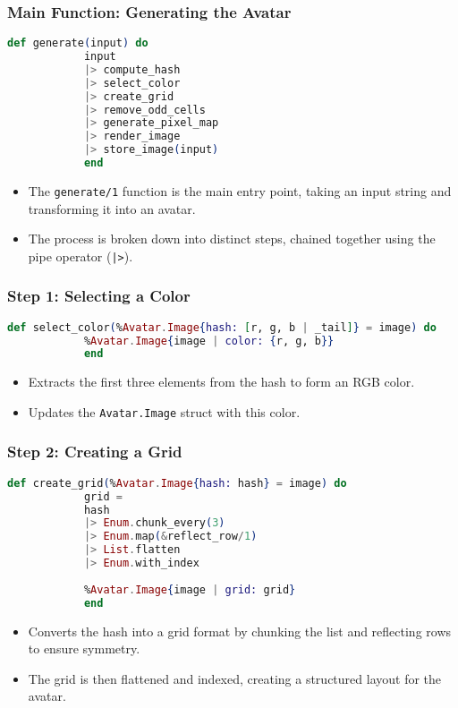 \documentclass[aspectratio=169, table]{beamer}
\begin{document}
	\begin{frame}[fragile]
		\frametitle{Main Function: Generating the Avatar}
		\begin{lstlisting}[language=Elixir]
			def generate(input) do
			input
			|> compute_hash
			|> select_color 
			|> create_grid
			|> remove_odd_cells
			|> generate_pixel_map
			|> render_image
			|> store_image(input)
			end
		\end{lstlisting}
		\begin{itemize}
			\item The \texttt{generate/1} function is the main entry point, taking an input string and transforming it into an avatar.
			\item The process is broken down into distinct steps, chained together using the pipe operator (\texttt{|>}).
		\end{itemize}
	\end{frame}
	
	\begin{frame}[fragile]
		\frametitle{Step 1: Selecting a Color}
		\begin{lstlisting}[language=Elixir]
			def select_color(%Avatar.Image{hash: [r, g, b | _tail]} = image) do
			%Avatar.Image{image | color: {r, g, b}}
			end
		\end{lstlisting}
		\begin{itemize}
			\item Extracts the first three elements from the hash to form an RGB color.
			\item Updates the \texttt{Avatar.Image} struct with this color.
		\end{itemize}
	\end{frame}
	
	\begin{frame}[fragile]
		\frametitle{Step 2: Creating a Grid}
		\begin{lstlisting}[language=Elixir]
			def create_grid(%Avatar.Image{hash: hash} = image) do
			grid =
			hash
			|> Enum.chunk_every(3)
			|> Enum.map(&reflect_row/1)
			|> List.flatten
			|> Enum.with_index
			
			%Avatar.Image{image | grid: grid}
			end
		\end{lstlisting}
		\begin{itemize}
			\item Converts the hash into a grid format by chunking the list and reflecting rows to ensure symmetry.
			\item The grid is then flattened and indexed, creating a structured layout for the avatar.
		\end{itemize}
	\end{frame}
	
\end{document}
